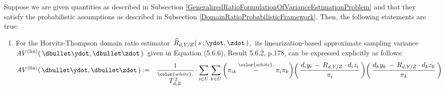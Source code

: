 \vskip 0.1cm
\begin{lemma}
\label{ApproximateVarianceEstimatorsForDomainRatios}
\mbox{}
\vskip 0.1cm
\noindent
Suppose we are given quantities as described in Subsection
\ref{GeneralizedRatioFormulationOfVarianceEstimationProblem}
and
that they satisfy the probabilistic assumptions as described in Subsection
\ref{DomainRatioProbabilisticFramework}.
Then, the following statements are true:
\renewcommand{\theenumi}{\roman{enumi}}
\renewcommand{\labelenumi}{\mbox{}\;\;\,(\theenumi)$\quad$}
\begin{enumerate}
\item
    For the Horvitz-Thompson domain ratio estimator
    \,$\widehat{R}_{d,Y/Z}(\,s\,;\ydot,\zdot\,)$,\,
    its {\color{red}linearization-based approximate sampling variance} 
    \,$AV^{\textnormal{(lin)}}(\,\dbullet\ydot,\dbullet\zdot\,)$\,
    given in Equation (5.6.6), Result 5.6.2, p.178, \cite{Sarndal1992}
    can be expressed explicitly as follows:
    \begin{eqnarray*}
    AV^{\textnormal{(lin)}}(\,\dbullet\ydot,\dbullet\zdot\,)
    & := &
        \dfrac{1}{
            \overset{{\color{white}.}}{T_{d,Z}^{\,2}}
            }
        \cdot
        \underset{i \in U}{\sum}\;
        \underset{k \in U}{\sum}
        \left(\pi_{ik} \overset{{\color{white}.}}{-} \pi_{i}\pi_{k}\right)
        \!
        \left(\,
            \dfrac{
                d_{i}y_{i} \,-\, R_{d,Y/Z}\cdot d_{i}z_{i}
                }{
                \pi_{i}
                }
            \,\right)
        \!
        \left(\,
            \dfrac{
                d_{k}y_{k} \,-\, R_{d,Y/Z}\cdot d_{k}z_{k}
                }{
                \pi_{k}
                }
            \,\right)

\end{eqnarray*}
\end{enumerate}
\end{lemma}
